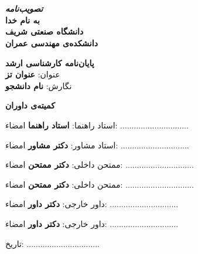 \chapter*{}
\begin{center}
\large
\textbf{\textit{تصویب‌نامه}}\\
\vspace{0.9cm}
\textbf{به نام خدا}\\
\textbf{دانشگاه صنعتی شریف}\\
\textbf{دانشکده‌ی مهندسی عمران}\\
\end{center}
\vspace{0.9cm}

\textbf{پایان‌نامه کارشناسی ارشد}\\

عنوان:
\textbf{عنوان تز}\\

نگارش:
\textbf{نام دانشجو}\\

\vspace{0.9cm}

\textbf{کمیته‌ی داوران}
\vspace{0.9cm}

استاد راهنما:
\textbf{استاد راهنما} \hfill امضاء: ..............................
\vspace{0.9cm}

استاد مشاور:
\textbf{دکتر مشاور} \hfill امضاء: ..............................
\vspace{0.9cm}

ممتحن داخلی:
\textbf{دکتر ممتحن} \hfill امضاء: ..............................
\vspace{0.9cm}

ممتحن داخلی:
\textbf{دکتر ممتحن} \hfill امضاء: ..............................
\vspace{0.9cm}

داور خارجی:
\textbf{دکتر داور} \hfill امضاء: ..............................
\vspace{0.9cm}

داور خارجی:
\textbf{دکتر داور} \hfill امضاء: ..............................
\vspace{0.9cm}


\hfill تاریخ: ................................

